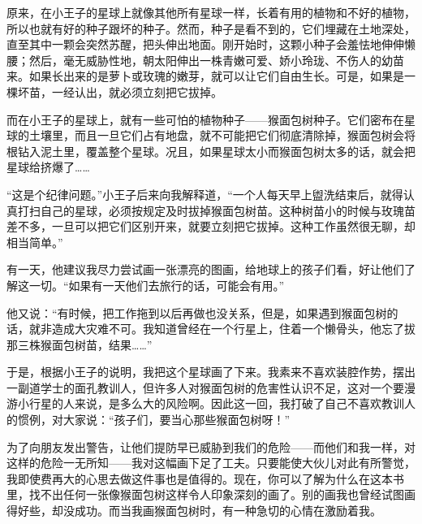 {\startalignment[center]
 \stopalignment}

原来，在小王子的星球上就像其他所有星球一样，长着有用的植物和不好的植物，所以也就有好的种子跟坏的种子。然而，种子是看不到的，它们埋藏在土地深处，直至其中一颗会突然苏醒，把头伸出地面。刚开始时，这颗小种子会羞怯地伸伸懒腰；然后，毫无威胁性地，朝太阳伸出一株青嫩可爱、娇小玲珑、不伤人的幼苗来。如果长出来的是萝卜或玫瑰的嫩芽，就可以让它们自由生长。可是，如果是一棵坏苗，一经认出，就必须立刻把它拔掉。

而在小王子的星球上，就有一些可怕的植物种子------猴面包树种子。它们密布在星球的土壤里，而且一旦它们占有地盘，就不可能把它们彻底清除掉，猴面包树会将根钻入泥土里，覆盖整个星球。况且，如果星球太小而猴面包树太多的话，就会把星球给挤爆了\ldots{}\ldots{}

“这是个纪律问题。”小王子后来向我解释道，“一个人每天早上盥洗结束后，就得认真打扫自己的星球，必须按规定及时拔掉猴面包树苗。这种树苗小的时候与玫瑰苗差不多，一旦可以把它们区别开来，就要立刻把它拔掉。这种工作虽然很无聊，却相当简单。”

有一天，他建议我尽力尝试画一张漂亮的图画，给地球上的孩子们看，好让他们了解这一切。“如果有一天他们去旅行的话，可能会有用。”

他又说：“有时候，把工作拖到以后再做也没关系，但是，如果遇到猴面包树的话，就非造成大灾难不可。我知道曾经在一个行星上，住着一个懒骨头，他忘了拔那三株猴面包树苗，结果\ldots{}\ldots{}”

{\startalignment[center]
 \stopalignment}

于是，根据小王子的说明，我把这个星球画了下来。我素来不喜欢装腔作势，摆出一副道学士的面孔教训人，但许多人对猴面包树的危害性认识不足，这对一个要漫游小行星的人来说，是多么大的风险啊。因此这一回，我打破了自己不喜欢教训人的惯例，对大家说：“孩子们，要当心那些猴面包树呀！”

为了向朋友发出警告，让他们提防早已威胁到我们的危险------而他们和我一样，对这样的危险一无所知------我对这幅画下足了工夫。只要能使大伙儿对此有所警觉，我即使费再大的心思去做这件事也是值得的。现在，你可以了解为什么在这本书里，找不出任何一张像猴面包树这样令人印象深刻的画了。别的画我也曾经试图画得好些，却没成功。而当我画猴面包树时，有一种急切的心情在激励着我。


\stoptitle

